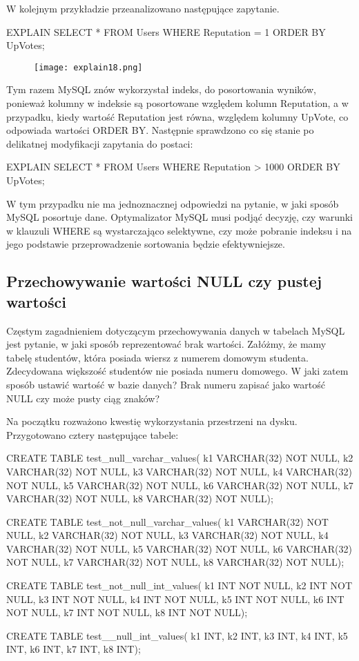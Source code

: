 W kolejnym przykładzie przeanalizowano następujące zapytanie.
\begin{spverbatim}
	EXPLAIN SELECT * FROM Users WHERE Reputation = 1 ORDER BY UpVotes;
\end{spverbatim}
\begin{figure}[h!]
	\texttt{[image: explain18.png]} 
\end{figure}
Tym razem MySQL znów wykorzystał indeks, do posortowania wyników, ponieważ kolumny w indeksie są posortowane względem kolumn Reputation, a w przypadku, kiedy wartość Reputation jest równa, względem kolumny UpVote, co odpowiada wartości ORDER BY.
Następnie sprawdzono co się stanie po delikatnej modyfikacji zapytania do postaci:
\begin{spverbatim}
	EXPLAIN SELECT * FROM Users WHERE Reputation > 1000 ORDER BY UpVotes;
\end{spverbatim}

W tym przypadku nie ma jednoznacznej odpowiedzi na pytanie, w jaki sposób MySQL posortuje dane. Optymalizator MySQL musi podjąć decyzję, czy warunki w klauzuli WHERE są wystarczająco selektywne, czy może pobranie indeksu i na jego podstawie przeprowadzenie sortowania będzie efektywniejsze.

\subsection{Przechowywanie wartości NULL czy pustej wartości}
Częstym zagadnieniem dotyczącym przechowywania danych w tabelach MySQL jest pytanie, w jaki sposób reprezentować brak wartości. Załóżmy, że mamy tabelę studentów, która posiada wiersz z numerem domowym studenta. Zdecydowana większość studentów nie posiada numeru domowego. W jaki zatem sposób ustawić wartość w bazie danych? Brak numeru zapisać jako wartość NULL czy może pusty ciąg znaków? 

Na początku rozważono kwestię wykorzystania przestrzeni na dysku. Przygotowano cztery następujące tabele:

\begin{spverbatim}
	CREATE TABLE test_null_varchar_values(
	k1 VARCHAR(32) NOT NULL, k2 VARCHAR(32) NOT NULL,
	k3 VARCHAR(32) NOT NULL, k4 VARCHAR(32) NOT NULL,
	k5 VARCHAR(32) NOT NULL, k6 VARCHAR(32) NOT NULL,
	k7 VARCHAR(32) NOT NULL, k8 VARCHAR(32) NOT NULL);
	
	CREATE TABLE test_not_null_varchar_values(
	k1 VARCHAR(32) NOT NULL, k2 VARCHAR(32) NOT NULL,
	k3 VARCHAR(32) NOT NULL, k4 VARCHAR(32) NOT NULL,
	k5 VARCHAR(32) NOT NULL, k6 VARCHAR(32) NOT NULL,
	k7 VARCHAR(32) NOT NULL, k8 VARCHAR(32) NOT NULL);
	
	CREATE TABLE test_not_null_int_values(
	k1 INT NOT NULL, k2 INT NOT NULL,
	k3 INT NOT NULL, k4 INT NOT NULL,
	k5 INT NOT NULL, k6 INT NOT NULL,
	k7 INT NOT NULL, k8 INT NOT NULL);
	
	CREATE TABLE test__null_int_values(
	k1 INT,	k2 INT,	k3 INT, k4 INT,
	k5 INT,	k6 INT,	k7 INT,	k8 INT);
	
\end{spverbatim}

